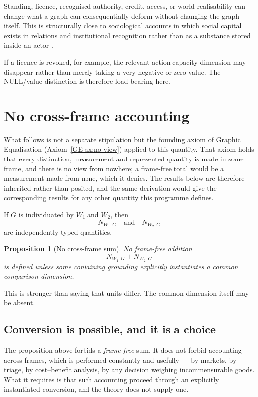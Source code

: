 \documentclass[11pt,a4paper]{article}
\newtheorem{proposition}[definition]{Proposition}
\theoremstyle{remark}
\begin{document}
Standing, licence, recognised authority, credit, access, or world realisability can change what a graph can consequentially deform without changing the graph itself. This is structurally close to sociological accounts in which social capital exists in relations and institutional recognition rather than as a substance stored inside an actor \citep{bourdieu1986forms,coleman1988social}.

If a licence is revoked, for example, the relevant action-capacity dimension may disappear rather than merely taking a very negative or zero value. The NULL/value distinction is therefore load-bearing here.

\section{No cross-frame accounting}\label{sec:cross-frame}

What follows is not a separate stipulation but the founding axiom of Graphic Equalisation
(Axiom~\ref{GE-ax:no-view}) applied to this quantity. That axiom holds that every distinction, measurement and represented quantity is made
in some frame, and there is no view from nowhere; a frame-free total would be a measurement made from
none, which it denies. The results below are therefore inherited rather than posited, and the same
derivation would give the corresponding results for any other quantity this programme defines.

If $G$ is individuated by $W_1$ and $W_2$, then
\[
N_{W_1:G}
\quad\text{and}\quad
N_{W_2:G}
\]
are independently typed quantities.

\begin{proposition}[No cross-frame sum]\label{prop:no-sum}
No frame-free addition
\[
N_{W_1:G}+N_{W_2:G}
\]
is defined unless some containing grounding explicitly instantiates a common comparison dimension.
\end{proposition}

This is stronger than saying that units differ. The common dimension itself may be absent.

\subsection*{Conversion is possible, and it is a choice}

The proposition above forbids a \emph{frame-free} sum. It does not forbid accounting across frames, which is performed constantly and usefully --- by markets, by triage, by cost--benefit analysis, by any decision weighing incommensurable goods. What it requires is that such accounting proceed through an explicitly instantiated conversion, and the theory does not supply one.
\end{document}
